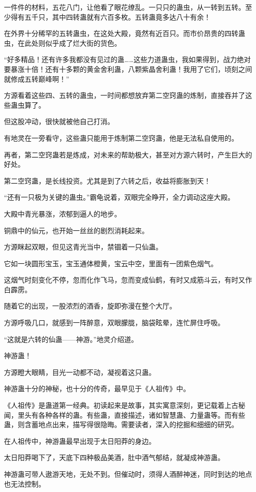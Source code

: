 \begin{this_body}
一件件的材料，五花八门，让他看了眼花缭乱。一只只的蛊虫，从一转到五转。至少得有五千只，其中四转蛊就有六百多枚。五转蛊竟多达八十有余！

在外界十分稀罕的五转蛊虫，在这处大殿，竟然有近百只。而市价昂贵的四转蛊虫，在此处则似乎成了烂大街的货色。

“好多精品！还有许多我都没有见过的蛊……这些力道蛊虫，我如果得到，战力绝对要暴涨十倍！还有十多颗的黄金舍利蛊，八颗紫晶舍利蛊！我用了它们，顷刻之间就修成五转巅峰啊！”

方源看着这些四、五转的蛊虫，一时间都想放弃第二空窍蛊的炼制，直接吞并了这些蛊虫算了。

但这股冲动，很快就被他自己打消。

有地灵在一旁看守，这些蛊只能用于炼制第二空窍蛊，他是无法私自使用的。

再者，第二空窍蛊若是炼成，对未来的帮助极大，甚至对方源六转时，产生巨大的好处。

第二空窍蛊，是长线投资。尤其是到了六转之后，收益将膨胀到天！

“还有一只极为关键的蛊虫。”霸龟说着，双眼完全睁开，全力调动这座大殿。

大殿中青光暴涨，浓郁到逼人的地步。

铜鼎中的仙元，也开始一丝丝的剧烈消耗起来。

方源眯起双眼，但见这青光当中，禁锢着一只仙蛊。

它如一块圆形宝玉，宝玉通体橙黄，宝云中空，里面有一团紫色烟气。

这烟气时刻变化不停，忽而化作飞马，忽而变成仙鹤，有时又成筋斗云，有时又作白霹雳。

随着它的出现，一股浓烈的酒香，旋即弥漫在整个大厅。

方源呼吸几口，就感到一阵醉意，双眼朦胧，脑袋眩晕，连忙屏住呼吸。

“这就是六转的仙蛊——神游。”地灵介绍道。

神游蛊！

方源瞪大眼睛，目光一动都不动，凝视着这只蛊。

神游蛊十分的神秘，也十分的传奇，最早见于《人祖传》中。

《人祖传》是蛊道第一经典。初读起来是故事，其实寓意深刻，更记载着上古秘闻，里头有各种各样的蛊。有些蛊，直接描述，诸如智慧蛊、力量蛊等。而有些蛊，则含蓄地点出来，描写得很隐晦。需要读者，深入的挖掘和细细的研究。

在人祖传中，神游蛊最早出现于太日阳莽的身边。

太日阳莽喝下了，天底下四种极品美酒，肚中酒气郁结，就凝成神游蛊。

神游蛊可带人遨游天地，无处不到。但催动时，须得人酒醉神迷，同时到达的地点也无法控制。


\end{this_body}
